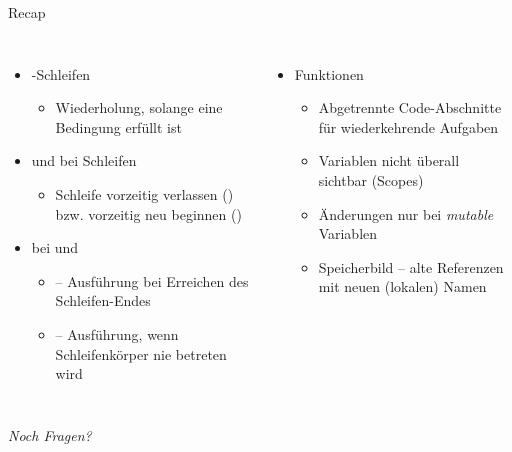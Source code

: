 
\begin{frame}[t,plain]
\titlepage
\end{frame}


\begin{frame}{Recap}
%
\begin{columns}[T]
\begin{itemize}
\item {}-Schleifen
	\begin{itemize}
	\item Wiederholung, solange eine Bedingung erfüllt ist
	\end{itemize}
\item {} und  bei Schleifen
	\begin{itemize}
	\item Schleife vorzeitig verlassen () bzw. vorzeitig neu beginnen ()
	\end{itemize}
\item {} bei  und 
	\begin{itemize}
	\item {}  -- Ausführung bei Erreichen des Schleifen-Endes
	\item {} -- Ausführung, wenn Schleifenkörper nie betreten wird
	\end{itemize}
\end{itemize}
%
\begin{itemize}
\item Funktionen
	\begin{itemize}
	\item Abgetrennte Code-Abschnitte für wiederkehrende Aufgaben
	\item Variablen nicht überall sichtbar (\thus Scopes)
	\item Änderungen nur bei \emph{mutable} Variablen
	\item Speicherbild -- alte Referenzen mit neuen (lokalen) Namen
	\end{itemize}
\end{itemize}

\end{columns}
%
\begin{center}
	\emph{Noch Fragen?}
\end{center}
%
\end{frame}

